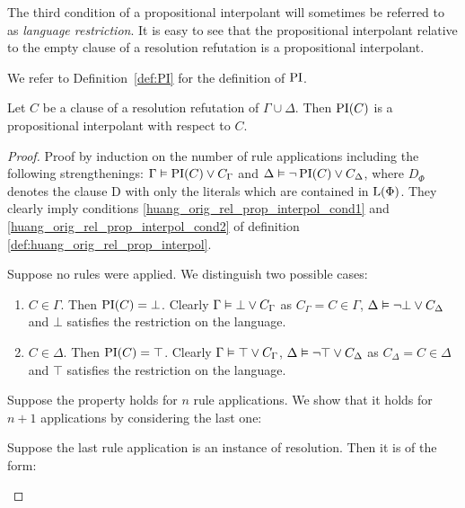 The third condition of a propositional interpolant will sometimes be referred to as \emph{language restriction}.
It is easy to see that the propositional interpolant relative to the empty clause of a resolution refutation is a propositional interpolant.

We refer to Definition~\ref{def:PI} for the definition of $\operatorname{PI}$.

\begin{prop}
	\label{prop:prop_interpol}
	Let $C$ be a clause of a resolution refutation of $\Gamma \cup \Delta$.
	Then $\operatorname{PI}(C)$ is a propositional interpolant with respect to $C$. 
\end{prop}
\begin{proof}
	Proof by induction on the number of rule applications including the following strengthenings:
	$\Gamma \vDash \operatorname{PI}(C) \lor C_\Gamma$ and
	$\Delta \vDash \lnot \operatorname{PI}(C) \lor C_\Delta$, where $D_\Phi$ denotes the clause D with only the literals which are contained in $\operatorname{L}(\Phi)$. They clearly imply conditions \ref{huang_orig_rel_prop_interpol_cond1} and \ref{huang_orig_rel_prop_interpol_cond2} of definition \ref{def:huang_orig_rel_prop_interpol}. 

	\begin{indproof}
			Suppose no rules were applied. We distinguish two possible cases:
			\begin{enumerate}
				\item $C \in \Gamma$.
					Then $\operatorname{PI}(C) = \bot$. Clearly $\Gamma \vDash \bot \lor C_\Gamma$ as $C_\Gamma = C \in \Gamma$, $\Delta \vDash \lnot \bot \lor C_\Delta$ and $\bot$ satisfies the restriction on the language.

				\item $C \in \Delta$.
					Then $\operatorname{PI}(C) = \top$. Clearly $\Gamma \vDash \top \lor C_\Gamma$, $\Delta \vDash \lnot \top \lor C_\Delta$ as $C_\Delta = C \in \Delta$ and $\top$ satisfies the restriction on the language.
			\end{enumerate}

			Suppose the property holds for $n$ rule applications.
			We show that it holds for $n+1$ applications by considering the last one:

			Suppose the last rule application is an instance of resolution. Then it is of the form:
			\begin{prooftree}
			\end{prooftree}


\end{indproof}
\end{proof}
